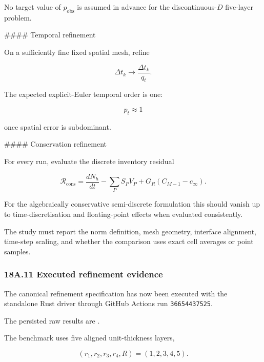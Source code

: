 \documentclass[11pt,a4paper]{article}
\begin{document}
No target value of $p_{\mathrm{obs}}$ is assumed in advance for the discontinuous-$D$ five-layer problem.

\#\#\#\# Temporal refinement

On a sufficiently fine fixed spatial mesh, refine

\begin{equation}
\Delta t_k
\to
\frac{\Delta t_k}{q_t}.
\tag{TRISO-ACC-315}
\label{eq:triso-acc-315}
\end{equation}

The expected explicit-Euler temporal order is one:

\begin{equation}
p_t\approx1
\tag{TRISO-ACC-316}
\label{eq:triso-acc-316}
\end{equation}

once spatial error is subdominant.

\#\#\#\# Conservation refinement

For every run, evaluate the discrete inventory residual

\begin{equation}
\mathcal R_{\mathrm{cons}}
=
\frac{dN_h}{dt}
-
\sum_PS_PV_P
+
G_R(C_{M-1}-c_\infty).
\tag{TRISO-ACC-317}
\label{eq:triso-acc-317}
\end{equation}

For the algebraically conservative semi-discrete formulation this should vanish up to time-discretisation and floating-point effects when evaluated consistently.

The study must report the norm definition, mesh geometry, interface alignment, time-step scaling, and whether the comparison uses exact cell averages or point samples.

\subsubsection*{18A.11 Executed refinement evidence}

The canonical refinement specification has now been executed with the standalone Rust driver  through GitHub Actions run \texttt{36654437525}.

The persisted raw results are .

The benchmark uses five aligned unit-thickness layers,

\begin{equation}
(r_1,r_2,r_3,r_4,R)=(1,2,3,4,5).
\tag{TRISO-ACC-318}
\label{eq:triso-acc-318}
\end{equation}
\end{document}
